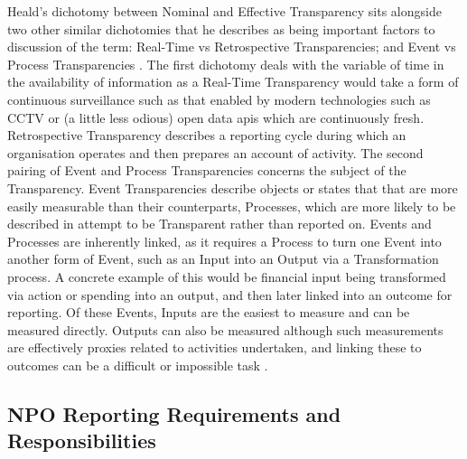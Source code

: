 Heald's dichotomy between Nominal and Effective Transparency sits alongside two other similar dichotomies that he describes as being important factors to discussion of the term: Real-Time vs Retrospective Transparencies; and Event vs Process Transparencies \cite{heald_varieties_2006}. The first dichotomy deals with the variable of time in the availability of information as a Real-Time Transparency would take a form of continuous surveillance such as that enabled by modern technologies such as CCTV or (a little less odious) open data apis which are continuously fresh. Retrospective Transparency describes a reporting cycle during which an organisation operates and then prepares an account of activity. The second pairing of Event and Process Transparencies concerns the subject of the Transparency. Event Transparencies describe objects or states that that are more easily measurable than their counterparts, Processes, which are more likely to be described in attempt to be Transparent rather than reported on. Events and Processes are inherently linked, as it requires a Process to turn one Event into another form of Event, such as an Input into an Output via a Transformation process. A concrete example of this would be financial input being transformed via action or spending into an output, and then later linked into an outcome for reporting. Of these Events, Inputs are the easiest to measure and can be measured directly. Outputs can also be measured although such measurements are effectively proxies related to activities undertaken, and linking these to outcomes can be a difficult or impossible task \cite{heald_varieties_2006}.


\subsection{NPO Reporting Requirements and Responsibilities}

